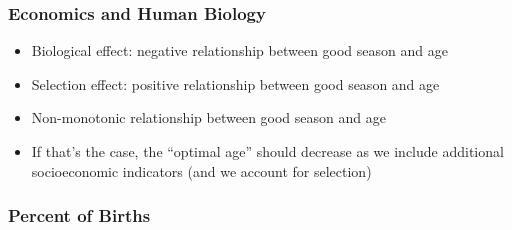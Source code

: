 \documentclass[10pt,letterpaper,subeqn]{beamer}
\begin{document}
\begin{frame}
\frametitle{Economics and Human Biology}
\begin{itemize}
\item Biological effect: negative relationship between good season and age
\item Selection effect: positive relationship between good season and age
\item Non-monotonic relationship between good season and age
\item If that's the case, the ``optimal age'' should decrease as we include additional socioeconomic indicators (and we account for selection)
\end{itemize}
\end{frame}



\begin{frame}
\frametitle{Percent of Births}
\begin{table}[htpb!]\caption{Percent of Births (NVSS 2005-2013)}
\label{bqTab:singleSum}\begin{center}
\end{center}
\end{table}
\end{frame}
\end{document}
